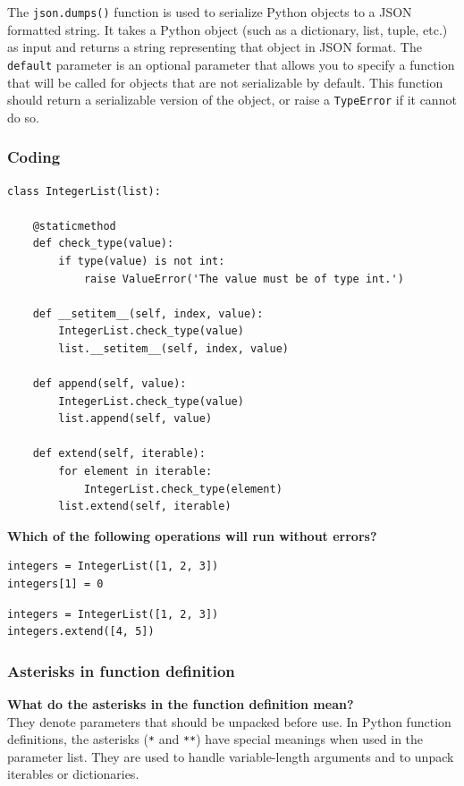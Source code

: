 The \texttt{json.dumps()} function is used to serialize Python objects to a JSON formatted string. It takes a Python object (such as a dictionary, list, tuple, etc.) as input and returns a string representing that object in JSON format. The \texttt{default} parameter is an optional parameter that allows you to specify a function that will be called for objects that are not serializable by default. This function should return a serializable version of the object, or raise a \texttt{TypeError} if it cannot do so.

\newpage
\subsubsection{Coding}

\begin{codebox}
\begin{verbatim}
class IntegerList(list):
 
    @staticmethod
    def check_type(value):
        if type(value) is not int:
            raise ValueError('The value must be of type int.')
 
    def __setitem__(self, index, value):
        IntegerList.check_type(value)
        list.__setitem__(self, index, value)
 
    def append(self, value):
        IntegerList.check_type(value)
        list.append(self, value)        
 
    def extend(self, iterable):
        for element in iterable:
            IntegerList.check_type(element)
        list.extend(self, iterable)
\end{verbatim}
\end{codebox}

\textbf{Which of the following operations will run without errors?}

\begin{codebox}
\begin{verbatim}
integers = IntegerList([1, 2, 3])
integers[1] = 0
\end{verbatim}
\end{codebox}

\begin{codebox}
\begin{verbatim}
integers = IntegerList([1, 2, 3])
integers.extend([4, 5])
\end{verbatim}
\end{codebox}

\newpage
\subsubsection{Asterisks in function definition}
\textbf{What do the asterisks in the function definition mean?}\\
They denote parameters that should be unpacked before use. In Python function definitions, the asterisks (\texttt{*} and \texttt{**}) have special meanings when used in the parameter list. They are used to handle variable-length arguments and to unpack iterables or dictionaries.

